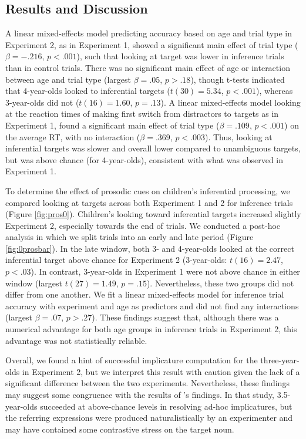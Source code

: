 \documentclass[10pt,letterpaper]{article}
\begin{document}
\subsection{Results and Discussion}

A linear mixed-effects model predicting accuracy based on age and trial type in Experiment 2, as in Experiment 1, showed a significant main effect of trial type ($\beta = -.216$, $p <.001$), such that looking at target was lower in inference trials than in control trials. There was no significant main effect of age or interaction between age and trial type (largest $\beta = .05$, $p >.18$), though t-tests indicated that 4-year-olds looked to inferential targets ($t(30) = 5.34$, $p <.001$), whereas 3-year-olds did not ($t(16) = 1.60$, $p =.13$). A linear mixed-effects model looking at the reaction times of making first switch from distractors to targets as in Experiment 1, found a significant main effect of trial type ($\beta = .109$, $p <.001$) on the average RT, with no interaction ($\beta = .369$, $p <.003$). Thus, looking at inferential targets was slower and overall lower compared to unambiguous targets, but was above chance (for 4-year-olds), consistent with what was observed in Experiment 1.

To determine the effect of prosodic cues on children's inferential processing, we compared looking at targets across both Experiment 1 and 2 for inference trials (Figure \ref{fig:pros0}). Children's looking toward inferential targets increased slightly Experiment 2, especially towards the end of trials. We conducted a post-hoc analysis in which we split trials into an early and late period (Figure \ref{fig:0prosbar}). In the late window, both 3- and 4-year-olds looked at the correct inferential target above chance for Experiment 2 (3-year-olds: $t(16) = 2.47$, $p < .03$). In contrast, 3-year-olds in Experiment 1 were not above chance in either window (largest $t(27) = 1.49$, $p = .15$). Nevertheless, these two groups did not differ from one another. We fit a linear mixed-effects model for inference trial accuracy with experiment and age as predictors and did not find any interactions (largest $\beta = .07$, $p > .27$). These findings suggest that, although there was a numerical advantage for both age groups in inference trials in Experiment 2, this advantage was not statistically reliable. 

Overall, we found a hint of successful implicature computation for the three-year-olds in Experiment 2, but we interpret this result with caution given the lack of a significant difference between the two experiments. Nevertheless, these findings may suggest some congruence with the results of 's findings. In that study, 3.5-year-olds succeeded at above-chance levels in resolving ad-hoc implicatures, but the referring expressions were produced naturalistically by an experimenter and may have contained some contrastive stress on the target noun. 
\end{document}
